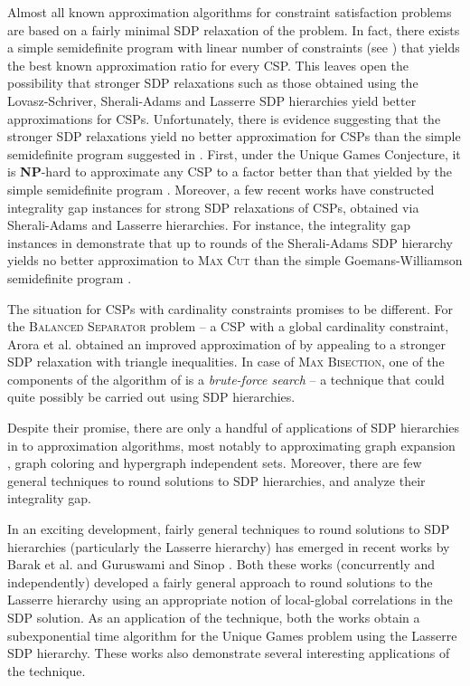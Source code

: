 \documentclass[11pt]{article}
\theoremstyle{definition}
\newcommand{\etal}{et al.\xspace}
\newcommand{\problemmacro}[1]{\texorpdfstring{\textsc{#1}}{#1}\xspace}
\newcommand{\maxcut}{\problemmacro{Max Cut}}
\newcommand{\balancedseparator}{\problemmacro{Balanced Separator}}
\newcommand{\maxbisection}{\problemmacro{Max Bisection}}
\numberwithin{equation}{section}
\newcommand{\cclassmacro}[1]{\texorpdfstring{\textbf{#1}}{#1}\xspace}
\newcommand{\NP}{\cclassmacro{NP}}
\begin{document}
Almost all known approximation algorithms for constraint satisfaction
problems are based on a fairly minimal SDP relaxation of the problem.
In fact, there exists a simple semidefinite program with linear number
of constraints (see \cite{Raghavendra08, RaghavendraS09b}) that yields the
best known approximation ratio for every CSP. This leaves open the possibility that stronger SDP relaxations such as
those obtained using the Lovasz-Schriver, Sherali-Adams and Lasserre
SDP hierarchies yield better approximations for CSPs.  Unfortunately,
there is evidence suggesting that the stronger SDP relaxations yield
no better approximation for CSPs than the simple semidefinite program
suggested in \cite{Raghavendra08,RaghavendraS09b}.  First, under the
Unique Games Conjecture, it is \NP-hard to approximate any CSP to a
factor better than that yielded by the simple semidefinite program
\cite{Raghavendra08}.  Moreover, a few recent works \cite{KhotS09,
Tulsiani09, RaghavendraS09c} have constructed
integrality gap instances for strong SDP relaxations of CSPs, obtained via Sherali-Adams and Lasserre
hierarchies.  For instance, the integrality gap instances in
\cite{KhotS09,RaghavendraS09c} demonstrate that up to 
rounds of the Sherali-Adams SDP hierarchy yields no better approximation
to \maxcut than the simple Goemans-Williamson semidefinite program
\cite{GoemansW95}.

The situation for CSPs with cardinality constraints promises
to be different.  For the \balancedseparator problem -- a CSP with a
global cardinality constraint, Arora \etal \cite{AroraRV04} obtained
an improved approximation of  by appealing to a
stronger SDP relaxation with triangle inequalities.  In case of
\maxbisection, one of the components of the algorithm of
\cite{GuruswamiMRSZ11} is a {\it brute-force search} -- a technique
that could quite possibly be carried out using SDP hierarchies.

Despite their promise, there are only a handful of applications of SDP hierarchies
in to approximation algorithms, most notably to approximating graph
expansion \cite{AroraRV04}, graph coloring and hypergraph independent
sets.  Moreover, there are few general techniques to round solutions to
SDP hierarchies, and analyze their integrality gap.

In an exciting development, fairly general techniques to round
solutions to SDP hierarchies (particularly the Lasserre hierarchy) has
emerged in recent works by Barak \etal \cite{BarakRS11} and Guruswami
and Sinop \cite{GuruswamiS11}.
Both these works (concurrently and independently) developed a fairly
general approach to round solutions to the Lasserre hierarchy using
an appropriate notion of local-global correlations in the SDP solution.
As an application of the technique, both the works obtain a
subexponential time algorithm for the Unique
Games problem using the Lasserre SDP hierarchy.  These works also
demonstrate several interesting applications of the technique.
\end{document}
